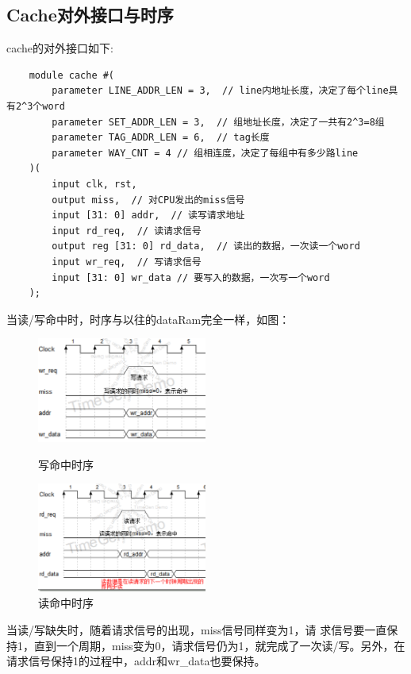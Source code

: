 \documentclass{ctexart}
\begin{document}
\subsection{\hei Cache对外接口与时序}
cache的对外接口如下:
\begin{lstlisting}
    module cache #(
        parameter LINE_ADDR_LEN = 3,  // line内地址长度，决定了每个line具有2^3个word
        parameter SET_ADDR_LEN = 3,  // 组地址长度，决定了一共有2^3=8组
        parameter TAG_ADDR_LEN = 6,  // tag长度
        parameter WAY_CNT = 4 // 组相连度，决定了每组中有多少路line
    )(
        input clk, rst,
        output miss,  // 对CPU发出的miss信号
        input [31: 0] addr,  // 读写请求地址
        input rd_req,  // 读请求信号
        output reg [31: 0] rd_data,  // 读出的数据，一次读一个word
        input wr_req,  // 写请求信号
        input [31: 0] wr_data // 要写入的数据，一次写一个word
    );
\end{lstlisting}
当读/写命中时，时序与以往的dataRam完全一样，如图：
\begin{figure}[H]
    \begin{minipage}[t]{0.5\linewidth}
        \centering
        \includegraphics[width=2.2in]{sx1.png}
        \caption{写命中时序}
        \label{fig:side:a}
    \end{minipage}%
    \begin{minipage}[t]{0.5\linewidth}
        \centering
        \includegraphics[width=2.2in]{sx2.png}
        \caption{读命中时序}
        \label{fig:side:b}
    \end{minipage}
\end{figure}
\par
当读/写缺失时，随着请求信号的出现，miss信号同样变为1，请
求信号要一直保持1，直到一个周期，miss变为0，请求信号仍为1，就完成了一次读/写。另外，在请求信号保持1的过程中，addr和wr\_data也要保持。
\end{document}
